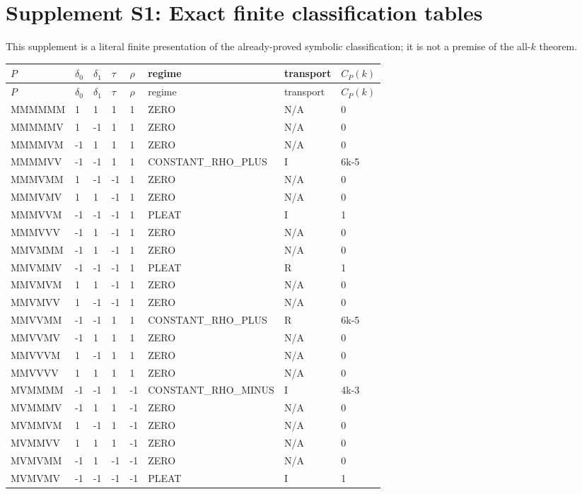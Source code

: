 \documentclass[10pt]{article}
\begin{document}
\section*{Supplement S1: Exact finite classification tables}
This supplement is a literal finite presentation of the already-proved symbolic classification; it is not a premise of the all-$k$ theorem.
\tiny
\begin{longtable}{llllllll}
\toprule
$P$ & $\delta_0$ & $\delta_1$ & $\tau$ & $\rho$ & regime & transport & $C_P(k)$ \\
\midrule
\endfirsthead
\toprule
$P$ & $\delta_0$ & $\delta_1$ & $\tau$ & $\rho$ & regime & transport & $C_P(k)$ \\
\midrule
\endhead
MMMMMM & 1 & 1 & 1 & 1 & ZERO & N/A & 0 \\
MMMMMV & 1 & -1 & 1 & 1 & ZERO & N/A & 0 \\
MMMMVM & -1 & 1 & 1 & 1 & ZERO & N/A & 0 \\
MMMMVV & -1 & -1 & 1 & 1 & CONSTANT\_RHO\_PLUS & I & 6k-5 \\
MMMVMM & 1 & -1 & -1 & 1 & ZERO & N/A & 0 \\
MMMVMV & 1 & 1 & -1 & 1 & ZERO & N/A & 0 \\
MMMVVM & -1 & -1 & -1 & 1 & PLEAT & I & 1 \\
MMMVVV & -1 & 1 & -1 & 1 & ZERO & N/A & 0 \\
MMVMMM & -1 & 1 & -1 & 1 & ZERO & N/A & 0 \\
MMVMMV & -1 & -1 & -1 & 1 & PLEAT & R & 1 \\
MMVMVM & 1 & 1 & -1 & 1 & ZERO & N/A & 0 \\
MMVMVV & 1 & -1 & -1 & 1 & ZERO & N/A & 0 \\
MMVVMM & -1 & -1 & 1 & 1 & CONSTANT\_RHO\_PLUS & R & 6k-5 \\
MMVVMV & -1 & 1 & 1 & 1 & ZERO & N/A & 0 \\
MMVVVM & 1 & -1 & 1 & 1 & ZERO & N/A & 0 \\
MMVVVV & 1 & 1 & 1 & 1 & ZERO & N/A & 0 \\
MVMMMM & -1 & -1 & 1 & -1 & CONSTANT\_RHO\_MINUS & I & 4k-3 \\
MVMMMV & -1 & 1 & 1 & -1 & ZERO & N/A & 0 \\
MVMMVM & 1 & -1 & 1 & -1 & ZERO & N/A & 0 \\
MVMMVV & 1 & 1 & 1 & -1 & ZERO & N/A & 0 \\
MVMVMM & -1 & 1 & -1 & -1 & ZERO & N/A & 0 \\
MVMVMV & -1 & -1 & -1 & -1 & PLEAT & I & 1 \\

\end{longtable}
\end{document}
